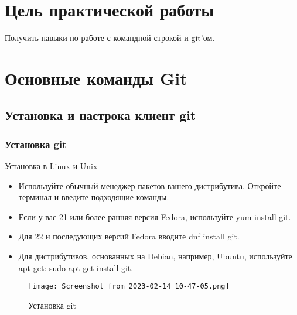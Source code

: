 \graphicspath{{~/Documents/SftAppDvTech/FirstTask/TheBasics}}
\chapter*{\LARGE{Цель практической работы}}
Получить навыки по работе с командной строкой и git’ом.

\chapter{Основные команды Git}

\section{Установка и настрока клиент git}
\subsection{Установка git}
Установка в Linux и Unix
\begin{itemize}
	\item Используйте обычный менеджер пакетов вашего дистрибутива.
		Откройте терминал и введите подходящие команды.
	\item Если у вас 21 или более ранняя версия Fedora,
		используйте yum install git.
	\item Для 22 и последующих версий Fedora вводите dnf install git.
	\item Для дистрибутивов, основанных на Debian, например, Ubuntu,
		используйте apt-get: sudo apt-get install git.
\end{itemize}
\begin{figure}[h!tp]
	\centering
	\texttt{[image: Screenshot from 2023-02-14 10-47-05.png]}
	\caption{Установка git}
	\label{fig:git:install}
\end{figure}

